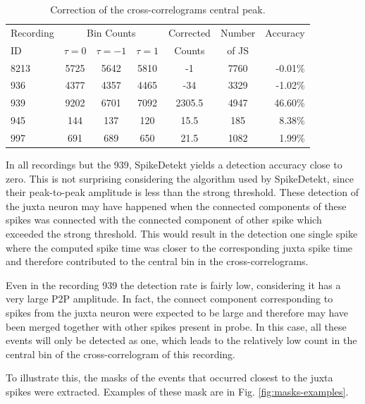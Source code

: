 \documentclass[10pt]{article}
\begin{document}
\begin{table}[!h]
\begin{center}
\begin{tabular}{p{1.5cm}cccccr} %

\multicolumn{ 1}{p{1.5cm}}{Recording } & \multicolumn{ 3}{c}{Bin Counts} &  \multicolumn{ 1}{p{1.3cm}}{Corrected} & \multicolumn{ 1}{c}{Number} & \multicolumn{ 1}{c}{Accuracy} \\ 
\multicolumn{ 1}{l}{ID} & $\tau=0$ & $\tau=-1$ & $\tau=1$ & \multicolumn{ 1}{c}{Counts} & \multicolumn{ 1}{p{1.3cm}}{of JS} & \multicolumn{ 1}{l}{} \\ \hline
8213 & 5725 & 5642 & 5810 & -1 & 7760 & -0.01\% \\
936 & 4377 & 4357 & 4465 & -34 & 3329 & -1.02\% \\
939 & 9202 & 6701 & 7092 & 2305.5 & 4947 & 46.60\% \\
945 & 144 & 137 & 120 & 15.5 & 185 & 8.38\% \\ 
997 & 691 & 689 & 650 & 21.5 & 1082 & 1.99\% \\ 
\end{tabular}
\end{center}
\caption{Correction of the cross-correlograms central peak.}
\label{tab:CCcorrection}
\end{table}


In all recordings but the 939, SpikeDetekt yields a detection accuracy close to zero. This is not surprising considering the algorithm used by SpikeDetekt, since their peak-to-peak amplitude is less than the strong threshold. These detection of the juxta neuron may have happened when the connected components of these spikes was connected with the connected component of other spike which exceeded the strong threshold. This would result in the detection one single spike where the computed spike time was closer to the corresponding juxta spike time and therefore contributed to the central bin in the cross-correlograms.

Even in the recording 939 the detection rate is fairly low, considering it has a very large P2P amplitude. In fact, the connect component corresponding to spikes from the juxta neuron were expected to be large and therefore may have been merged together with other spikes present in probe. In this case, all these events will only be detected as one, which leads to the relatively low count in the central bin of the cross-correlogram of this recording.

To illustrate this, the masks of the events that occurred closest to the juxta spikes were extracted. Examples of these mask are in Fig. \ref{fig:masks-examples}.
 
\end{document}
